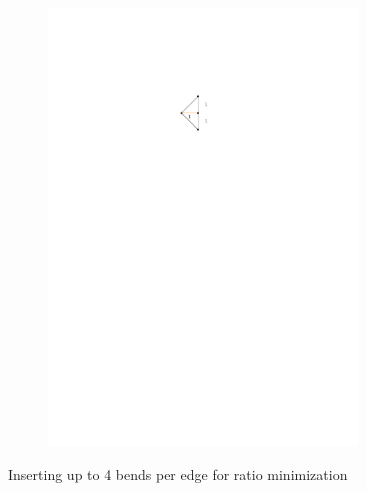 	\begin{figure}[H]
	\centering
	\begin{subfigure}{0.6\linewidth}
		\centering
		\includegraphics[width=0.9\textwidth,page=13]{drawings/maximal_planar.pdf}
	\end{subfigure}
	\caption{Inserting up to 4 bends per edge for ratio minimization}
\end{figure}
